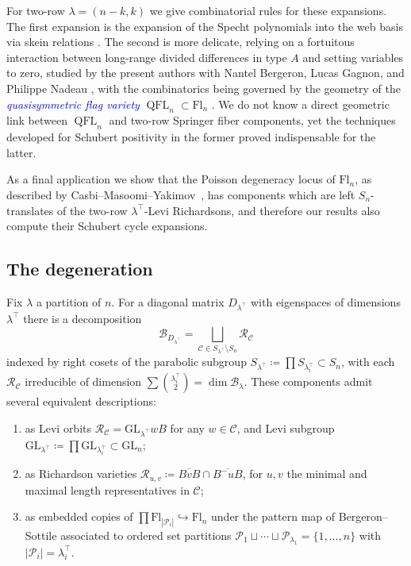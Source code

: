 \documentclass[11pt]{amsart}
\theoremstyle{definition}
\numberwithin{equation}{section}
\newcommand{\fl}[1]{\mathrm{Fl}_{#1}}
\newcommand{\GL}{\mathrm{GL}}
\renewcommand\emph[1]{\textcolor{blue}{\textit{#1}}} %
\begin{document}
For two-row $\lambda=(n-k,k)$ we give combinatorial rules for these expansions.
The first expansion is the expansion of the Specht polynomials into the web basis via skein relations \cite{Rho19}.
The second is more delicate, relying on a fortuitous interaction between long-range divided differences in type $A$ and setting variables to zero, studied by the present authors with Nantel Bergeron, Lucas Gagnon, and Philippe Nadeau \cite{BGNST1,NST_c}, with the combinatorics being governed by the geometry of the \emph{quasisymmetric flag variety} $\operatorname{QFL}_n\subset \fl{n}$ \cite{BGNST2}.
We do not know a direct geometric link between $\operatorname{QFL}_n$ and two-row Springer fiber components, yet the techniques developed for Schubert positivity in the former proved indispensable for the latter.

As a final application we show that the Poisson degeneracy locus of $\fl{n}$, as described by Casbi--Masoomi--Yakimov~\cite{CMY}, has components which are left $S_n$-translates of the two-row $\lambda^{\top}$-Levi Richardsons, and therefore our results also compute their Schubert cycle expansions.

\subsection{The degeneration}
Fix $\lambda$ a partition of $n$.
For a diagonal matrix $D_{\lambda^{\top}}$ with eigenspaces of dimensions $\lambda^{\top}$ there is a decomposition $$
\mathcal{B}_{D_{\lambda^{\top}}}=\bigsqcup_{\mathcal{C}\in S_{\lambda^{\top}}\setminus S_n} \mathcal{R}_{\mathcal{C}}
$$
indexed by right cosets of the parabolic subgroup $S_{\lambda^{\top}}\coloneqq \prod S_{\lambda_i^{\top}}\subset S_n$, with each $\mathcal{R}_\mathcal{C}$ irreducible of dimension $\sum \binom{\lambda_i^{\top}}{2}=\dim \mathcal{B}_\lambda$.
These components admit several equivalent descriptions:
\begin{enumerate}
    \item as Levi orbits $\mathcal{R}_{\mathcal{C}}=\GL_{\lambda^{\top}}wB$ for any $w\in \mathcal{C}$, and Levi subgroup $\GL_{\lambda^{\top}}\coloneqq\prod \GL_{\lambda_i^{\top}}\subset \GL_n$;
    \item as Richardson varieties $\mathcal{R}_{u,v}\coloneqq \overline{BvB}\cap \overline{B^-uB}$, for $u,v$ the minimal and maximal length representatives in $\mathcal{C}$;
    \item as embedded copies of $\prod \fl{|\mathcal{P}_i|}\hookrightarrow \fl{n}$ under the pattern map of Bergeron--Sottile \cite{BS98,BS99} associated to ordered set partitions $\mathcal{P}_1\sqcup \cdots \sqcup \mathcal{P}_{\lambda_1}= \{1,\ldots,n\}$ with $|\mathcal{P}_i|=\lambda_i^{\top}$.
\end{enumerate}
\end{document}
